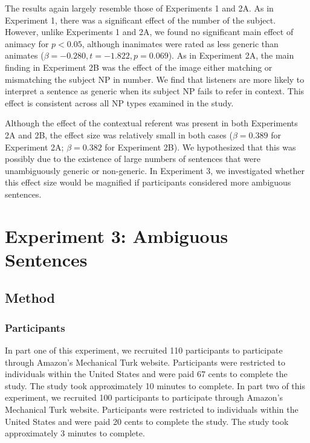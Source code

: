 \documentclass[10pt,letterpaper]{article}
\begin{document}
The results again largely resemble those of Experiments 1 and 2A. As in Experiment 1, there was a significant effect of the number of the subject. However, unlike Experiments 1 and 2A, we found no significant main effect of animacy for \(p < 0.05\), although inanimates were rated as less generic than animates (\(\beta = -0.280, t = -1.822, p = 0.069\)). As in Experiment 2A, the main finding in Experiment 2B was the effect of the image either matching or mismatching the subject NP in number. We find that listeners are more likely to interpret a sentence as generic when its subject NP fails to refer in context. This effect is consistent across all NP types examined in the study.

Although the effect of the contextual referent was present in both Experiments 2A and 2B, the effect size was relatively small in both cases (\(\beta = 0.389\) for Experiment 2A; \(\beta = 0.382\) for Experiment 2B). We hypothesized that this was possibly due to the existence of large numbers of sentences that were unambiguously generic or non-generic. In Experiment 3, we investigated whether this effect size would be magnified if participants considered more ambiguous sentences. 

\section{Experiment 3: Ambiguous Sentences}

\subsection{Method} 

\subsubsection{Participants} \quad In part one of this experiment, we recruited 110 participants to participate through Amazon's Mechanical Turk website. Participants were restricted to individuals within the United States and were paid 67 cents to complete the study. The study took approximately 10 minutes to complete. In part two of this experiment, we recruited 100 participants to participate through Amazon's Mechanical Turk website. Participants were restricted to individuals within the United States and were paid 20 cents to complete the study. The study took approximately 3 minutes to complete.
\end{document}
